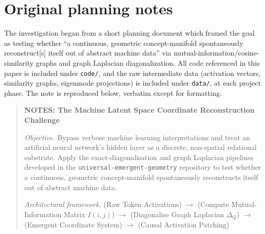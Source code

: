 \documentclass[11pt]{article}
\begin{document}
\appendix
\section{Original planning notes}
\label{app:notes}
The investigation began from a short planning document
which framed the goal as testing whether ``a continuous, geometric
concept-manifold spontaneously reconstruct[s] itself out of abstract machine
data'' via mutual-information/cosine-similarity graphs and graph Laplacian
diagonalization. All code referenced in this paper is included under
\texttt{code/}, and the raw intermediate data (activation vectors,
similarity graphs, eigenmode projections) is included under \texttt{data/},
at each project phase. The note is reproduced below, verbatim except for
formatting.

\begin{quote}
\small
\textbf{NOTES: The Machine Latent Space Coordinate Reconstruction Challenge}

\textit{Objective.} Bypass verbose machine learning interpretations and
treat an artificial neural network's hidden layer as a discrete,
non-spatial relational substrate. Apply the exact-diagonalisation and graph
Laplacian pipelines developed in the \texttt{universal-emergent-geometry}
repository to test whether a continuous, geometric concept-manifold
spontaneously reconstructs itself out of abstract machine data.

\textit{Architectural framework.} (Raw Token Activations) $\to$ (Compute
Mutual-Information Matrix $I(i,j)$) $\to$ (Diagonalise Graph Laplacian
$\Delta_Q$) $\to$ (Emergent Coordinate System) $\to$ (Causal Activation
Patching)


\end{quote}
\end{document}
